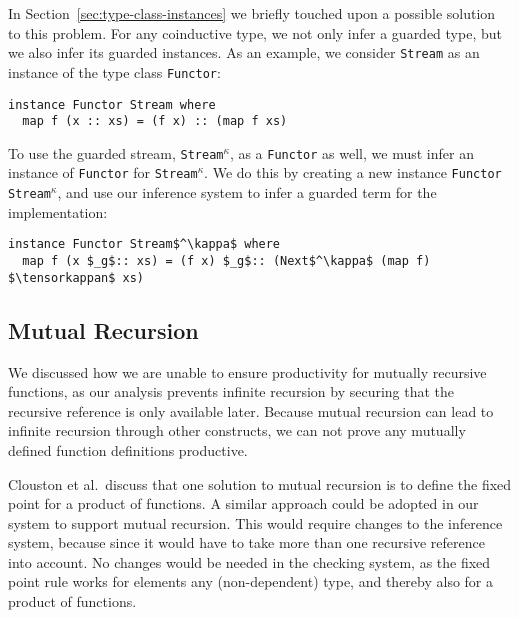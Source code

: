 In Section~\ref{sec:type-class-instances} we briefly touched upon a possible
solution to this problem. For any coinductive type, we not only infer a
guarded type, but we also infer its guarded instances. As an example, we
consider \texttt{Stream} as an instance of the type class \texttt{Functor}:

\begin{lstlisting}[mathescape, title=\idrisBlock]
instance Functor Stream where
  map f (x :: xs) = (f x) :: (map f xs)
\end{lstlisting}

To use the guarded stream, \texttt{Stream}$^\kappa$, as a \texttt{Functor} as well, we
must infer an instance of \texttt{Functor} for \texttt{Stream}$^\kappa$. We do
this by creating a new instance \texttt{Functor Stream}$^\kappa$, and use our
inference system to infer a guarded term for the implementation:

\begin{lstlisting}[mathescape, title=\idrisBlock]
instance Functor Stream$^\kappa$ where
  map f (x $_g$:: xs) = (f x) $_g$:: (Next$^\kappa$ (map f) $\tensorkappan$ xs)
\end{lstlisting}


\subsection{Mutual Recursion}
We discussed how we are unable to ensure productivity for mutually recursive
functions, as our analysis prevents infinite recursion by securing that the
recursive reference is only available later. Because mutual recursion can lead
to infinite recursion through other constructs, we can not prove any mutually
defined function definitions productive.

Clouston et al.\,\citep{BirkedalL:guarded-lambda-conf} discuss that one solution
to mutual recursion is to define the fixed point for a product of functions. A
similar approach could be adopted in our system to support mutual
recursion. This would require changes to the inference system, because since it
would have to take more than one recursive reference into account. No changes
would be needed in the checking system, as the fixed point rule works for elements any
(non-dependent) type, and thereby also for a product of functions.

